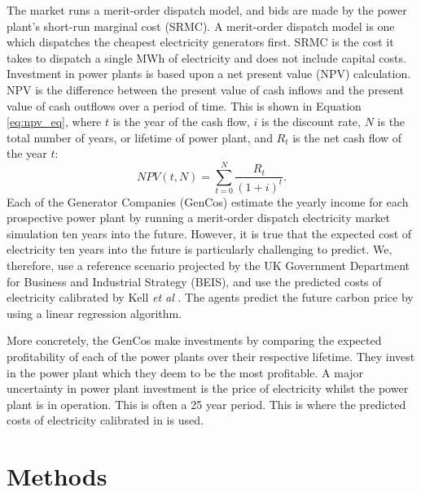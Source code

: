 \documentclass[final,3p,times,twocolumn,numbers]{elsarticle}
\begin{document}
The market runs a merit-order dispatch model, and bids are made by the power plant's short-run marginal cost (SRMC). A merit-order dispatch model is one which dispatches the cheapest electricity generators first. SRMC is the cost it takes to dispatch a single MWh of electricity and does not include capital costs. Investment in power plants is based upon a net present value (NPV) calculation. NPV is the difference between the present value of cash inflows and the present value of cash outflows over a period of time. This is shown in Equation \ref{eq:npv_eq}, where $t$ is the year of the cash flow, $i$ is the discount rate, $N$ is the total number of years, or lifetime of power plant, and $R_t$ is the net cash flow of the year $t$:
\begin{equation} \label{eq:npv_eq}
NPV(t, N) = \sum_{t=0}^{N}\frac{R_t}{(1+i)^t}.
\end{equation}
Each of the Generator Companies (GenCos) estimate the yearly income for each prospective power plant by running a merit-order dispatch electricity market simulation ten years into the future. However, it is true that the expected cost of electricity ten years into the future is particularly challenging to predict. We, therefore, use a reference scenario projected by the UK Government Department for Business and Industrial Strategy (BEIS), and use the predicted costs of electricity calibrated by Kell \textit{et al} \cite{Kell2020, DBEIS2019}. The agents predict the future carbon price by using a linear regression algorithm.

More concretely, the GenCos make investments by comparing the expected profitability of each of the power plants over their respective lifetime. They invest in the power plant which they deem to be the most profitable. A major uncertainty in power plant investment is the price of electricity whilst the power plant is in operation. This is often a 25 year period. This is where the predicted costs of electricity calibrated in \cite{Kell2020} is used.
 
\section{Methods}
\label{sec:methods}

\end{document}
